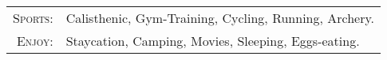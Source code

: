 %
%



\begin{tabular}{rl}
    \textsc{Sports:} & Calisthenic, Gym-Training, Cycling, Running, Archery.\\
    \textsc{Enjoy:} & Staycation, Camping, Movies, Sleeping, Eggs-eating.\\
\end{tabular}